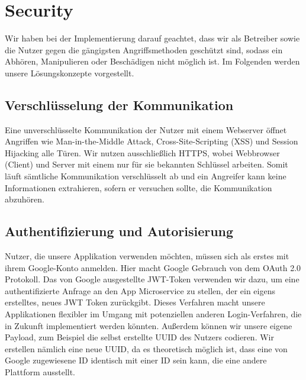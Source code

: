 \documentclass{article}
\begin{document}

\section{Security} %
Wir haben bei der Implementierung darauf geachtet, dass wir als Betreiber sowie die Nutzer gegen die gängigsten Angriffsmethoden geschützt sind, sodass ein Abhören, Manipulieren oder Beschädigen nicht möglich ist. Im Folgenden werden unsere Lösungskonzepte vorgestellt.

\subsection{Verschlüsselung der Kommunikation}
Eine unverschlüsselte Kommunikation der Nutzer mit einem Webserver öffnet Angriffen wie Man-in-the-Middle Attack, Cross-Site-Scripting (XSS) und Session Hijacking alle Türen. Wir nutzen ausschließlich HTTPS,
wobei Webbrowser (Client) und Server mit einem nur für sie bekannten Schlüssel arbeiten.
Somit läuft sämtliche Kommunikation verschlüsselt ab und ein Angreifer kann keine Informationen extrahieren, sofern er versuchen sollte, die Kommunikation abzuhören.

\subsection{Authentifizierung und Autorisierung}
\label{sec:authentication}
Nutzer, die unsere Applikation verwenden möchten, müssen sich als erstes mit ihrem Google-Konto anmelden. Hier macht Google Gebrauch von dem OAuth 2.0 Protokoll. Das von Google ausgestellte JWT-Token verwenden wir dazu, um eine authentifizierte Anfrage an den App Microservice zu stellen, der ein eigens erstelltes, neues JWT Token zurückgibt. Dieses Verfahren macht unsere Applikationen flexibler im Umgang mit potenziellen anderen Login-Verfahren, die in Zukunft implementiert werden könnten. Außerdem können wir unsere eigene Payload, zum Beispiel die selbst erstellte UUID des Nutzers codieren. Wir erstellen nämlich eine neue UUID, da es theoretisch möglich ist, dass eine von Google zugewiesene ID identisch mit einer ID sein kann, die eine andere Plattform ausstellt.
\end{document}
